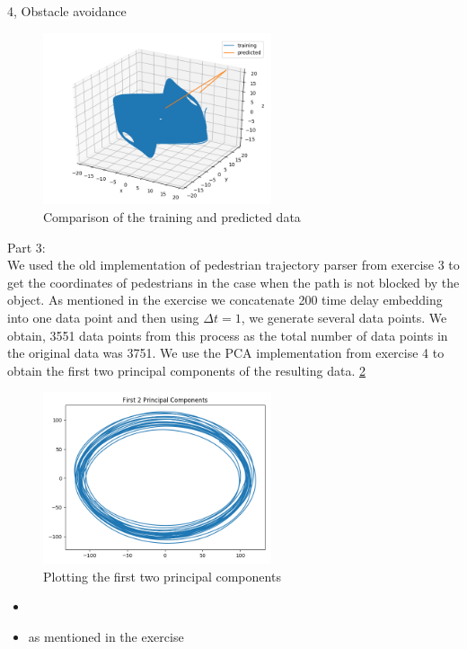 \documentclass[10pt,a4paper]{article}
\begin{document}
\begin{task}{4, Obstacle avoidance}
\begin{figure}[H]
\centering
\includegraphics[width=0.6\textwidth]{../plots/task4_part2_bonus.png}
\caption{Comparison of the training and predicted data}
\label{fig:task4_part2_bonus}
\end{figure}

Part 3: \\
We used the old implementation of pedestrian trajectory parser from exercise 3 to get the coordinates of pedestrians in the case when the path is not blocked by the object. As mentioned in the exercise we concatenate 200 time delay embedding into one data point and then using $\Delta t = 1$, we generate several data points. We obtain, 3551 data points from this process as the total number of data points in the original data was 3751. 
We use the PCA implementation from exercise 4 to obtain the first two principal components of the resulting data. \ref{fig:task4_part3}

\begin{figure}[H]
\centering
\includegraphics[width=0.6\textwidth]{../plots/task4_part3.png}
\caption{Plotting the first two principal components}
\label{fig:task4_part3}
\end{figure}

\begin{itemize}
 \item 
 \item as mentioned in the exercise
\end{itemize}
\end{task}
\end{document}
